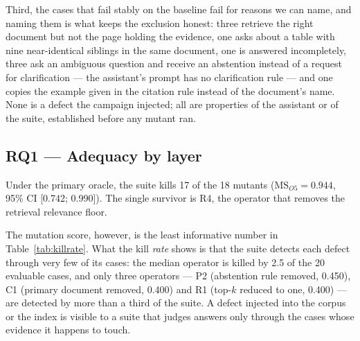 \documentclass[a4paper,fleqn]{cas-dc}
\newcommand{\MS}{\mathrm{MS}}
\begin{document}
Third, the cases that fail stably on the baseline fail for reasons we can name,
and naming them is what keeps the exclusion honest: three retrieve the right
document but not the page holding the evidence, one asks about a table with
nine near-identical siblings in the same document, one is answered
incompletely, three ask an ambiguous question and receive an abstention instead
of a request for clarification --- the assistant's prompt has no clarification
rule --- and one copies the example given in the citation rule instead of the
document's name. None is a defect the campaign injected; all are properties of
the assistant or of the suite, established before any mutant ran.

\subsection{RQ1 --- Adequacy by layer}
\label{sec:rq1}

Under the primary oracle, the suite kills 17 of the 18 mutants
($\MS_{O5} = 0.944$, 95\% CI [0.742; 0.990]). The single survivor is R4, the
operator that removes the retrieval relevance floor.

The mutation score, however, is the least informative number in
Table~\ref{tab:killrate}. What the kill \emph{rate} shows is that the suite
detects each defect through very few of its cases: the median operator is
killed by 2.5 of the 20 evaluable cases, and only three operators --- P2
(abstention rule removed, 0.450), C1 (primary document removed, 0.400) and R1
(top-$k$ reduced to one, 0.400) --- are detected by more than a third of the
suite. A defect injected into the corpus or the index is visible to a suite
that judges answers only through the cases whose evidence it happens to touch.
\end{document}
